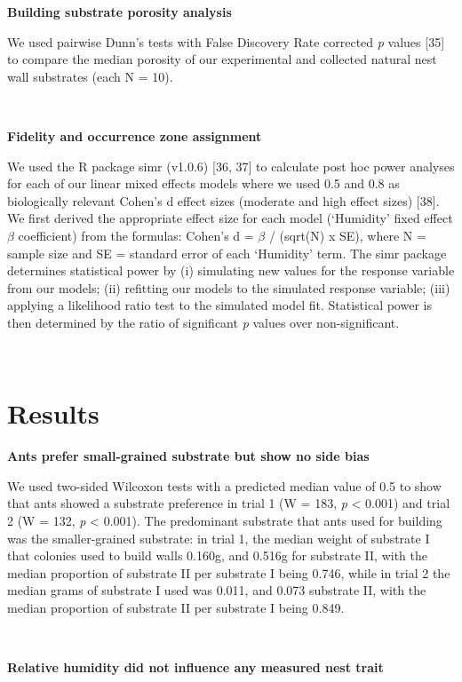 \documentclass[3p]{elsarticle} %
\begin{document}
\textbf{Building substrate porosity analysis}

We used pairwise Dunn's tests with False Discovery Rate corrected
\emph{p} values {[}35{]} to compare the median porosity of our
experimental and collected natural nest wall substrates (each N = 10).

~

\textbf{Fidelity and occurrence zone assignment}

We used the R package simr (v1.0.6) {[}36, 37{]} to calculate post hoc
power analyses for each of our linear mixed effects models where we used
0.5 and 0.8 as biologically relevant Cohen's d effect sizes (moderate
and high effect sizes) {[}38{]}. We first derived the appropriate effect
size for each model (`Humidity' fixed effect \(\beta\) coefficient) from
the formulas: Cohen's d = \(\beta\) / (sqrt(N) x SE), where N = sample
size and SE = standard error of each `Humidity' term. The simr package
determines statistical power by (i) simulating new values for the
response variable from our models; (ii) refitting our models to the
simulated response variable; (iii) applying a likelihood ratio test to
the simulated model fit. Statistical power is then determined by the
ratio of significant \emph{p} values over non-significant.

~

\hypertarget{results}{%
\section{Results}\label{results}}

\textbf{Ants prefer small-grained substrate but show no side bias}

We used two-sided Wilcoxon tests with a predicted median value of 0.5 to
show that ants showed a substrate preference in trial 1 (W = 183,
\emph{p} \textless{} 0.001) and trial 2 (W = 132, \emph{p} \textless{}
0.001). The predominant substrate that ants used for building was the
smaller-grained substrate: in trial 1, the median weight of substrate I
that colonies used to build walls 0.160g, and 0.516g for substrate II,
with the median proportion of substrate II per substrate I being 0.746,
while in trial 2 the median grams of substrate I used was 0.011, and
0.073 substrate II, with the median proportion of substrate II per
substrate I being 0.849.

~

\textbf{Relative humidity did not influence any measured nest trait}
\end{document}
